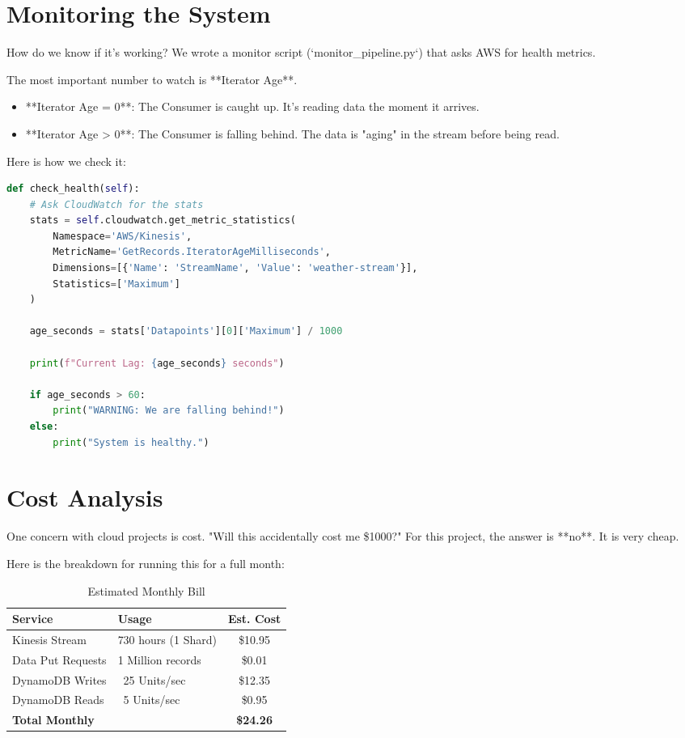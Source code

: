 \documentclass[12pt, a4paper]{article}
\begin{document}
\newpage

\section{Monitoring the System}

How do we know if it's working? We wrote a monitor script (`monitor_pipeline.py`) that asks AWS for health metrics.

The most important number to watch is **Iterator Age**.
\begin{itemize}
    \item **Iterator Age = 0**: The Consumer is caught up. It's reading data the moment it arrives.
    \item **Iterator Age > 0**: The Consumer is falling behind. The data is "aging" in the stream before being read.
\end{itemize}

Here is how we check it:

\begin{lstlisting}[language=Python, caption=Health Check]
def check_health(self):
    # Ask CloudWatch for the stats
    stats = self.cloudwatch.get_metric_statistics(
        Namespace='AWS/Kinesis',
        MetricName='GetRecords.IteratorAgeMilliseconds',
        Dimensions=[{'Name': 'StreamName', 'Value': 'weather-stream'}],
        Statistics=['Maximum']
    )
    
    age_seconds = stats['Datapoints'][0]['Maximum'] / 1000
    
    print(f"Current Lag: {age_seconds} seconds")
    
    if age_seconds > 60:
        print("WARNING: We are falling behind!")
    else:
        print("System is healthy.")
\end{lstlisting}

\section{Cost Analysis}

One concern with cloud projects is cost. "Will this accidentally cost me \$1000?"
For this project, the answer is **no**. It is very cheap.

Here is the breakdown for running this for a full month:

\begin{table}[H]
\centering
\begin{tabular}{llc}
\toprule
\textbf{Service} & \textbf{Usage} & \textbf{Est. Cost} \\
\midrule
Kinesis Stream & 730 hours (1 Shard) & \$10.95 \\
Data Put Requests & 1 Million records & \$0.01 \\
DynamoDB Writes & ~25 Units/sec & \$12.35 \\
DynamoDB Reads & ~5 Units/sec & \$0.95 \\
\midrule
\textbf{Total Monthly} & & \textbf{\$24.26} \\
\bottomrule
\end{tabular}
\caption{Estimated Monthly Bill}
\end{table}
\end{document}
